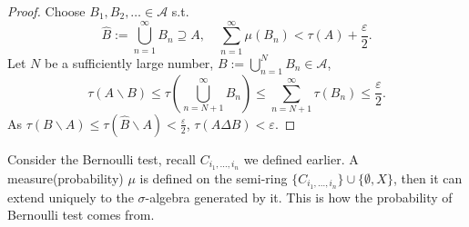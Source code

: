 \begin{proof}[Proof]
    Choose $B_1,B_2,\dots\in \mathscr{A}$ s.t.
	\[
	\hat{B} := \bigcup_{n=1}^\infty B_n \supseteq A, \quad
	\sum_{n=1}^{\infty}\mu(B_n) < \tau(A) + \frac{\varepsilon}{2}.
	\]
	Let $N$ be a sufficiently large number,
	$B := \bigcup_{n=1}^N B_n\in \mathscr{A}$,
	\[
	\tau(A\backslash B) \le \tau\left(\bigcup_{n=N+1}^\infty B_n\right)
	\le \sum_{n=N+1}^{\infty} \tau(B_n)\le \frac{\varepsilon}{2}.
	\]
	As $\tau(B \backslash A)\le \tau(\hat{B} \backslash A)< \frac{\varepsilon}{2}$,
	$\tau(A\Delta B) < \varepsilon$.
\end{proof}

\begin{example}
    Consider the Bernoulli test,
	recall $C_{i_1,\dots,i_n}$ we defined earlier.
	A measure(probability) $\mu$ is defined on
	the semi-ring $\{C_{i_1,\dots,i_n}\}\cup\{\emptyset,X\}$,
	then it can extend uniquely to the $\sigma$-algebra
	generated by it. This is how the probability of
	Bernoulli test comes from.
\end{example}

